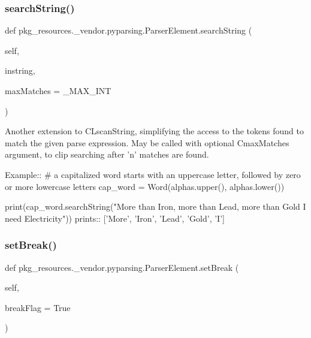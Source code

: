 \subsubsection{\texorpdfstring{search\+String()}{searchString()}}
{\footnotesize\ttfamily def pkg\+\_\+resources.\+\_\+vendor.\+pyparsing.\+Parser\+Element.\+search\+String (\begin{DoxyParamCaption}\item[{}]{self,  }\item[{}]{instring,  }\item[{}]{max\+Matches = {\ttfamily \+\_\+MAX\+\_\+INT} }\end{DoxyParamCaption})}

\begin{DoxyVerb}Another extension to C{L{scanString}}, simplifying the access to the tokens found
to match the given parse expression.  May be called with optional
C{maxMatches} argument, to clip searching after 'n' matches are found.

Example::
    # a capitalized word starts with an uppercase letter, followed by zero or more lowercase letters
    cap_word = Word(alphas.upper(), alphas.lower())
    
    print(cap_word.searchString("More than Iron, more than Lead, more than Gold I need Electricity"))
prints::
    ['More', 'Iron', 'Lead', 'Gold', 'I']
\end{DoxyVerb}
 \mbox{\label{classpkg__resources_1_1__vendor_1_1pyparsing_1_1_parser_element_a28cc2d9e28a3a71517249b2e9e5df9d5}} 
\subsubsection{\texorpdfstring{set\+Break()}{setBreak()}}
{\footnotesize\ttfamily def pkg\+\_\+resources.\+\_\+vendor.\+pyparsing.\+Parser\+Element.\+set\+Break (\begin{DoxyParamCaption}\item[{}]{self,  }\item[{}]{break\+Flag = {\ttfamily True} }\end{DoxyParamCaption})}

